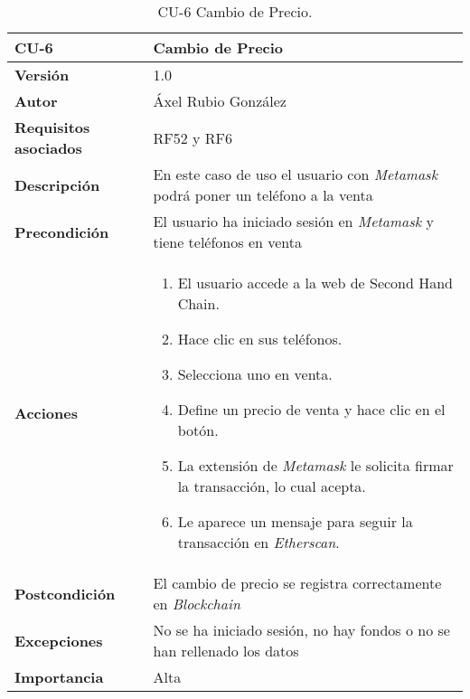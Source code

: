 \begin{table}[p]
	\centering
	\begin{tabularx}{\linewidth}{ p{} p{} }
		\toprule
		\textbf{CU-6}    & \textbf{Cambio de Precio}\\
		\toprule
		\textbf{Versión}              & 1.0    \\
		\textbf{Autor}                & Áxel Rubio González \\
		\textbf{Requisitos asociados} & RF52 y RF6 \\
		\textbf{Descripción}          & En este caso de uso el usuario con \textit{Metamask} podrá poner un teléfono a la venta  \\
		\textbf{Precondición}         & El usuario ha iniciado sesión en \textit{Metamask} y tiene teléfonos en venta \\
		\textbf{Acciones}             &
		\begin{enumerate}
			\def\labelenumi{\arabic{enumi}.}
			\tightlist
			\item El usuario accede a la web de Second Hand Chain.
			\item Hace clic en sus teléfonos.
                \item Selecciona uno en venta.
                \item Define un precio de venta y hace clic en el botón.
                \item La extensión de \textit{Metamask} le solicita firmar la transacción, lo cual acepta.
                \item Le aparece un mensaje para seguir la transacción en \textit{Etherscan}.
		\end{enumerate}\\
		\textbf{Postcondición}        & El cambio de precio se registra correctamente en \textit{Blockchain} \\
		\textbf{Excepciones}          & No se ha iniciado sesión, no hay fondos o no se han rellenado los datos \\
		\textbf{Importancia}          & Alta \\
		\bottomrule
	\end{tabularx}
	\caption{CU-6 Cambio de Precio.}
\end{table}

